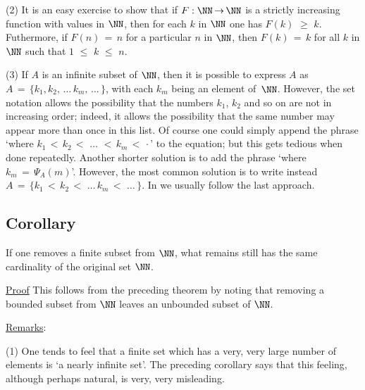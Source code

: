 \V

        (2) It is an easy exercise to show that if $F:{\NN} \,{\rightarrow}\, {\NN}$ is a strictly increasing function with values in ${\NN}$,
    then for each $k$ in ${\NN}$ one has $F(k)\,\,{\geq}\,\,k$. Futhermore, if $F(n) \,=\, n$ for a particular $n$ in ${\NN}$,
    then $F(k) \,=\, k$ for all $k$ in ${\NN}$ such that $1\,\,{\leq}\,\,k\,\,{\leq}\,\,n$.

\V

        (3) If $A$ is an infinite subset of ${\NN}$, then it is possible to express $A$ as $A \,=\, \{k_{1}, k_{2}, \,{\ldots}\,k_{m},\,{\ldots}\,\}$,
    with each $k_{m}$ being an element of~${\NN}$. However, the set notation allows the possibility that the numbers
    $k_{1}$, $k_{2}$ and so on are not in increasing order; indeed, it allows the possibility that the same number may appear more than once in this list.
    Of course one could simply append the phrase `where $k_{1}\,<\,k_{2}\,<\,\,{\ldots}\,\,<\,k_{m}\,<\,{\cdot}$' to the equation;
    but this gets tedious when done repeatedly. Another shorter solution is to add the phrase `where $k_{m} \,=\, {\Psi}_{A}(m)$'.
    However, the most common solution is to write instead $A \,=\, \{k_{1}\,<\,k_{2}\,<\,\,{\ldots}\,k_{m}\,<\,\,{\ldots}\,\}$.
    In {\ThisText} we usually follow the last approach.


\VV


            \subsection{\small{\bf Corollary}}
            \label{CorA20.20}

\V

        If one removes a finite subset from ${\NN}$, what remains still has the same cardinality of the original set ${\NN}$.

\V

        \underline{Proof} This follows from the preceding theorem by noting that  removing a bounded subset from ${\NN}$ leaves an unbounded subset of ${\NN}$.

\V

        \underline{Remarks}:

\V

        (1) One tends to feel that a finite set which has a very, very large number of elements is `a nearly infinite set'.
    The preceding corollary says that this feeling, although perhaps natural, is very, very misleading.

